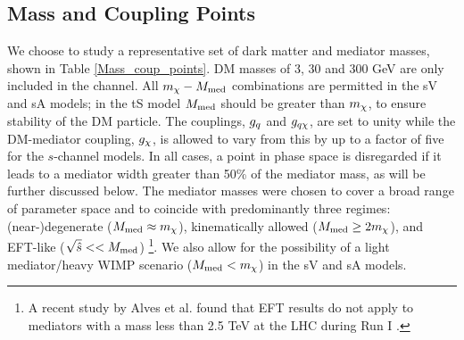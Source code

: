\subsection{Mass and Coupling Points}  %
We choose to study a representative set of dark matter and mediator masses, shown in Table \ref{Mass_coup_points}. DM masses of 3, 30 and 300 GeV are only included in the \monoZ channel. All $m_{\chi}-M_{\mathrm{med}}$ combinations are permitted in the sV and sA models; in the tS model $M_{\mathrm{med}}$ should be greater than $m_{\chi}$, to ensure stability of the DM particle. The couplings, $g_q$ and $g_{q \chi}$, are set to unity while the DM-mediator coupling, $g_{\chi}$, is allowed to vary from this by up to a factor of five for the $s$-channel models. In all cases, a point in phase space is disregarded if it leads to a mediator width greater than 50\% of the mediator mass, as will be further discussed below. The mediator masses were chosen to cover a broad range of parameter space and to coincide with predominantly three regimes: (near-)degenerate ($M_{\mathrm{med}} \approx m_{\chi}$), kinematically allowed ($M_{\mathrm{med}} \geq 2 m_{\chi}$), and EFT-like ($\sqrt{\hat{s}} << M_{\mathrm{med}} $) \footnote{A recent study by Alves et al. found that EFT results do not apply to mediators with a mass less than 2.5 TeV at the LHC during Run I \cite{Alves:2011wf}.}. We also allow for the possibility of a light mediator/heavy WIMP scenario ($M_{\mathrm{med}} < m_{\chi}$) in the sV and sA models.

